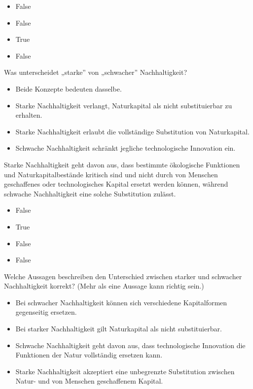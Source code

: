 \documentclass[
  nswissgerman,
  a4paper,
  openany]{book}
\providecommand{\tightlist}{%
  \setlength{\itemsep}{0pt}\setlength{\parskip}{0pt}}
\begin{document}
\begin{itemize}
\tightlist
\item
  False
\item
  False
\item
  True
\item
  False
\end{itemize}

Was unterscheidet „starke'' von „schwacher'' Nachhaltigkeit?

\begin{itemize}
\tightlist
\item[$\square$]
  Beide Konzepte bedeuten dasselbe.
\item[$\square$]
  Starke Nachhaltigkeit verlangt, Naturkapital als nicht substituierbar
  zu erhalten.
\item[$\square$]
  Starke Nachhaltigkeit erlaubt die vollständige Substitution von
  Naturkapital.
\item[$\square$]
  Schwache Nachhaltigkeit schränkt jegliche technologische Innovation
  ein.
\end{itemize}

Starke Nachhaltigkeit geht davon aus, dass bestimmte ökologische
Funktionen und Naturkapitalbestände kritisch sind und nicht durch von
Menschen geschaffenes oder technologisches Kapital ersetzt werden
können, während schwache Nachhaltigkeit eine solche Substitution
zulässt.

\begin{itemize}
\tightlist
\item
  False
\item
  True
\item
  False
\item
  False
\end{itemize}

Welche Aussagen beschreiben den Unterschied zwischen starker und
schwacher Nachhaltigkeit korrekt? (Mehr als eine Aussage kann richtig
sein.)

\begin{itemize}
\tightlist
\item[$\square$]
  Bei schwacher Nachhaltigkeit können sich verschiedene Kapitalformen
  gegenseitig ersetzen.
\item[$\square$]
  Bei starker Nachhaltigkeit gilt Naturkapital als nicht substituierbar.
\item[$\square$]
  Schwache Nachhaltigkeit geht davon aus, dass technologische Innovation
  die Funktionen der Natur vollständig ersetzen kann.
\item[$\square$]
  Starke Nachhaltigkeit akzeptiert eine unbegrenzte Substitution
  zwischen Natur- und von Menschen geschaffenem Kapital.
\end{itemize}
\end{document}
